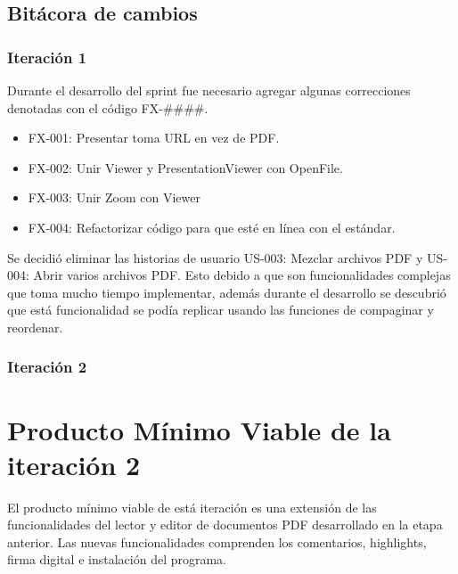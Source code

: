 \subsection{Bitácora de cambios}

\subsubsection{Iteración 1}

Durante el desarrollo del sprint fue necesario agregar algunas correcciones denotadas con el código FX-\#\#\#\#.
\begin{itemize}
    \item FX-001: Presentar toma URL en vez de PDF.
    \item FX-002: Unir Viewer y PresentationViewer con OpenFile.
    \item FX-003: Unir Zoom con Viewer
    \item FX-004: Refactorizar código para que esté en línea con el estándar.
\end{itemize}

Se decidió eliminar las historias de usuario US-003: Mezclar archivos PDF y US-004: Abrir varios archivos PDF. Esto debido a que son funcionalidades complejas que toma mucho tiempo implementar, además durante el desarrollo se descubrió que está funcionalidad se podía replicar usando las funciones de compaginar y reordenar.

\subsubsection{Iteración 2}


\section{Producto Mínimo Viable de la iteración 2}

El producto mínimo viable de está iteración es una extensión de las funcionalidades del lector y editor de documentos PDF desarrollado en la etapa anterior. Las nuevas funcionalidades comprenden los comentarios, highlights, firma digital e instalación del programa.

